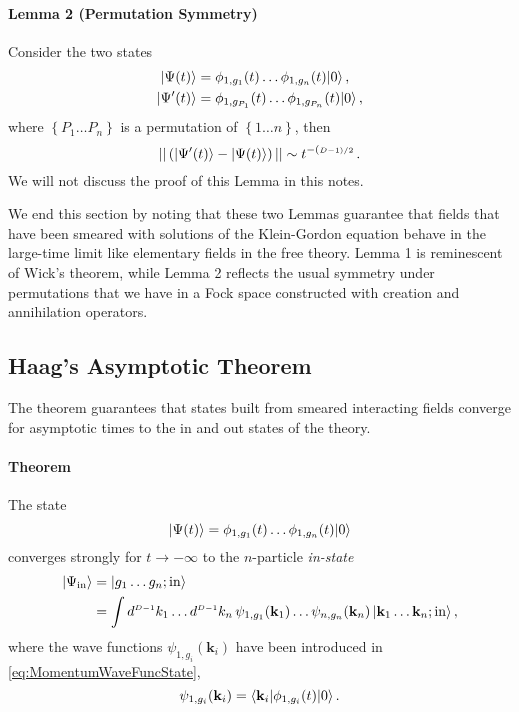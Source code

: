 \paragraph{Lemma 2 (Permutation Symmetry)}

Consider the two states
\begin{align}
    \label{eq:ProdPhiState}
    | \Psi(t) \rangle 
        &= \phi_{1,g_{1}}(t) \ldots \phi_{1,g_{n}}(t) | 0 \rangle\, , \\
    \label{eq:ProdPhiStatePerm}
    | \Psi'(t) \rangle
        &= \phi_{1,g_{P_1}}(t) \ldots \phi_{1,g_{P_n}}(t) | 0 \rangle\, , 
\end{align}
where $\left\{P_1 \ldots P_n\right\}$ is a permutation of $\left\{1 \ldots
n\right\}$, then 
\begin{equation}
    \label{eq:PermutationSymmetry}
    || \left(| \Psi'(t) \rangle - | \Psi(t) \rangle\right) || \sim
    t^{-(\scriptscriptstyle{D-1})/2}\, .
\end{equation}
We will not discuss the proof of this Lemma in this notes. 

We end this section by noting that these two Lemmas guarantee that fields that
have been smeared with solutions of the Klein-Gordon equation behave in the
large-time limit like elementary fields in the free theory. Lemma 1 is
reminescent of Wick's theorem, while Lemma 2 reflects the usual symmetry under
permutations that we have in a Fock space constructed with
creation and annihilation operators. 

\subsection{Haag's Asymptotic Theorem}
\label{sec:HaggAsympThm}

The theorem guarantees
that states built from smeared interacting fields converge for asymptotic times to 
the in and out states of the theory. 

\paragraph{Theorem}

The state
\begin{equation}
    \label{eq:HaagAsymptState}
    | \Psi(t) \rangle = 
    \phi_{1,g_1}(t) \ldots \phi_{1,g_n}(t) | 0 \rangle
\end{equation}
converges strongly for $t \to -\infty$ to the $n$-particle {\em in-state}
\begin{align}
    | \Psi_\mathrm{in} \rangle 
        &= | g_1 \ldots g_n; \mathrm{in} \rangle \\
        &= \int d^{\scriptscriptstyle{D-1}}k_1 \ldots d^{\scriptscriptstyle{D-1}}k_n\,
            \psi_{1,g_1}(\mathbf{k}_1) \ldots \psi_{n,g_n}(\mathbf{k}_n) \,
            | \mathbf{k}_1 \ldots \mathbf{k}_n; \mathrm{in} \rangle\, ,
\end{align}
where the wave functions $\psi_{1,g_i}(\mathbf{k}_i)$ have been introduced in 
\eqref{eq:MomentumWaveFuncState},
\begin{equation}
    \psi_{1,g_i}(\mathbf{k}_i) =
    \langle \mathbf{k}_i | \phi_{1,g_i}(t) | 0 \rangle\, .
\end{equation}

